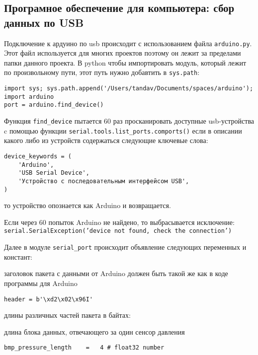 \documentclass[../main.tex]{subfiles}
\begin{document}
\subsection{Програмное обеспечение для компьютера: сбор данных по USB}


Подключение к ардуино по usb происходит с использованием файла \texttt{arduino.py}. Этот файл используется для многих проектов поэтому он лежит за пределами папки данного проекта. 
В python чтобы импортировать модуль, который лежит по произвольному пути, этот путь нужно добавтить в \texttt{sys.path}:

\begin{lstlisting}
import sys; sys.path.append('/Users/tandav/Documents/spaces/arduino'); import arduino
port = arduino.find_device()
\end{lstlisting}

Функция \texttt{find\_device} пытается 60 раз просканировать доступные usb-устройства c помощью функции \texttt{serial.tools.list\_ports.comports()} если в описании какого либо из устройств содержаться следующие ключевые слова: 

\begin{lstlisting}
device_keywords = (
    'Arduino',
    'USB Serial Device',
    'Устройство с последовательным интерфейсом USB',
)
\end{lstlisting}

то устройство опознается как Arduino и возвращается. 

Если через 60 попыток Arduino не найдено, то выбрасывается исключение: \texttt{serial.SerialException('device not found, check the connection')}


Далее в модуле \verb|serial_port| происходит объявление следующих переменных и констант:

заголовок пакета с данными от Arduino
должен быть такой же как в коде программы для Arduino
\begin{lstlisting}
header = b'\xd2\x02\x96I'
\end{lstlisting}

длины различных частей пакета в байтах:

длина блока данных, отвечающего за один сенсор давления
\begin{lstlisting}
bmp_pressure_length    =   4 # float32 number
\end{lstlisting}
\end{document}
